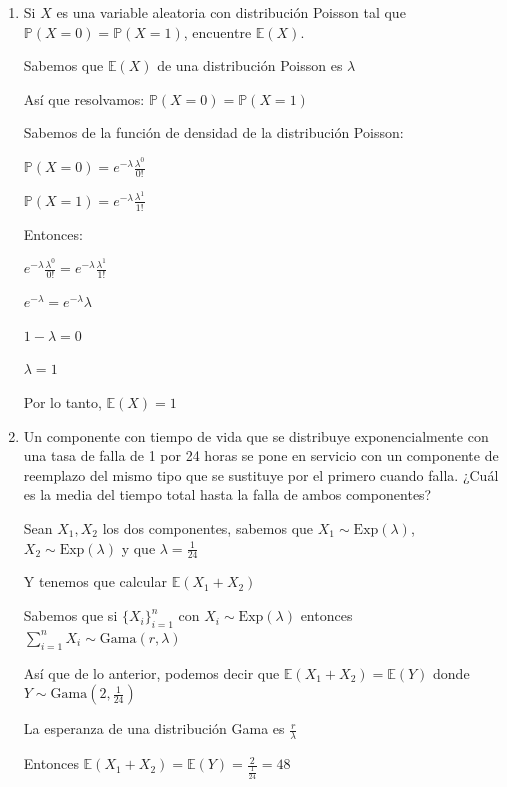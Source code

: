 \documentclass[11pt,a4paper]{report}
\begin{document}
\begin{enumerate}
{		}

		\item{
			Si $X$ es una variable aleatoria con distribución Poisson tal que
			$\mathbb{P}(X = 0) = \mathbb{P}(X = 1)$, encuentre $\mathbb{E}(X)$.
				
			Sabemos que $\mathbb{E}(X)$ de una distribución Poisson es $\lambda$
			
			Así que resolvamos: $\mathbb{P}(X = 0) = \mathbb{P}(X = 1)$
			
			Sabemos de la función de densidad de la distribución Poisson:
			
			$\mathbb{P}(X = 0) = e^{-\lambda} \frac{\lambda^{0}}{0!}$
			
			$\mathbb{P}(X = 1) = e^{-\lambda} \frac{\lambda^{1}}{1!}$

			
			Entonces:
			
			$e^{-\lambda} \frac{\lambda^{0}}{0!} = e^{-\lambda} \frac{\lambda^{1}}{1!}$
			
			$e^{-\lambda}  =  e^{-\lambda} \lambda$
			
			$1 - \lambda =  0$
						
			$\lambda = 1$
		
			Por lo tanto, $ \mathbb{E}(X) = 1$\\
		}

		\item{
			Un componente con tiempo de vida que se distribuye exponencialmente
			con una tasa de falla de 1 por 24 horas se pone en servicio con un
			componente de reemplazo del mismo tipo que se sustituye por el
			primero cuando falla. ¿Cuál es la media del tiempo total hasta la
			falla de ambos componentes?
			
			Sean $X_{1}, X_{2}$ los dos componentes, sabemos que $X_{1} \sim \text{Exp}(\lambda)$, $X_{2} \sim \text{Exp}(\lambda)$  y que $\lambda = \frac{1}{24}$
			
			Y tenemos que calcular $\mathbb{E}(X_{1} + X_{2})$ 
			
			Sabemos que si $\{X_i\}_{i=1}^{n}$ con $X_{i} \sim \text{Exp}(\lambda)$ entonces $\sum_{i=1}^{n}  X_{i} \sim \text{Gama}(r, \lambda) $
			
			Así que de lo anterior, podemos decir que  $\mathbb{E}(X_{1} + X_{2}) = \mathbb{E}(Y)$ donde $Y \sim \text{Gama}(2, \frac{1}{24})$
			
			La esperanza de una distribución Gama es $\frac{r}{\lambda}$
			
			Entonces $\mathbb{E}(X_{1} + X_{2}) = \mathbb{E}(Y) = \frac{2}{\frac{1}{24}} = 48$
			
}
\end{enumerate}
\end{document}
